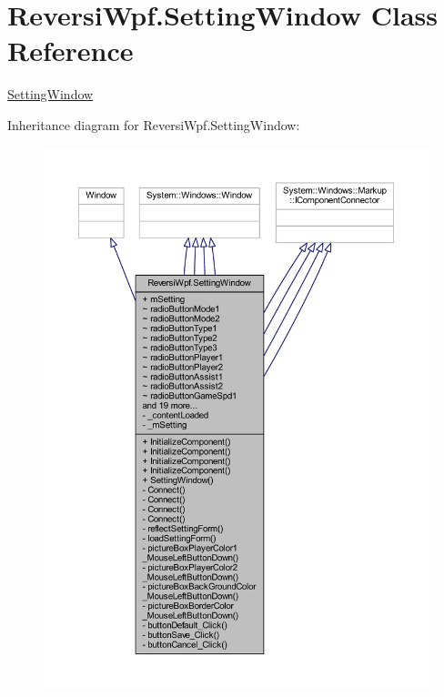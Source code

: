 \hypertarget{class_reversi_wpf_1_1_setting_window}{}\section{Reversi\+Wpf.\+Setting\+Window Class Reference}
\label{class_reversi_wpf_1_1_setting_window}


\hyperlink{class_reversi_wpf_1_1_setting_window}{Setting\+Window}  




Inheritance diagram for Reversi\+Wpf.\+Setting\+Window\+:
\nopagebreak
\begin{figure}[H]
\begin{center}
\leavevmode
\includegraphics[width=350pt]{class_reversi_wpf_1_1_setting_window__inherit__graph}
\end{center}
\end{figure}


